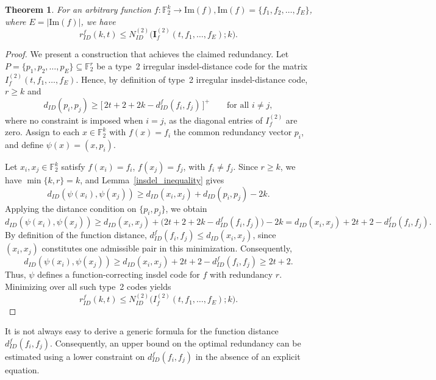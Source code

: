 \documentclass[11 pt]{article}
\numberwithin{equation}{section}
\newtheorem{theorem}{Theorem}[section]
\begin{document}
        \begin{theorem}\label{upper_bound_red}
        For an arbitrary function $f : \mathbb{F}_2^k \to \mathrm{Im}(f), \mathrm{Im}(f) = 
        \{f_1,f_2, \ldots ,f_E \}$, where $E = |\mathrm{Im}(f)|$, we have 
        \[
        r_{ID}^f(k,t) \leq N_{ID}^{(2)}\big(\bm{I}_f^{(2)}(t, f_1, \ldots, f_E);k\big).
        \]
        \end{theorem}
        \begin{proof}
        We present a construction that achieves the claimed redundancy. Let $P = \{p_1, p_2, \ldots, p_E\} \subseteq \mathbb{F}_2^{r}$ be a 
        type~2 irregular insdel-distance code for the matrix $I^{(2)}_f(t, f_1, \ldots, f_E)$. Hence, by definition of type~2 irregular insdel-distance code, $r \geq k$ and
        \[
        d_{ID}(p_i, p_j)
        \geq \big[\, 2t + 2 + 2k - d^{f}_{ID}(f_i, f_j) \,\big]^{+} 
        \qquad \text{for all } i \neq j,
        \]
        where no constraint is imposed when $i = j$, as the diagonal entries of $I^{(2)}_f$ are zero. Assign to each $x \in \mathbb{F}_2^k$ with $f(x) = f_i$ the common redundancy vector $p_i$, and define $\psi(x) = (x, p_i)$.
        
        \noindent
        Let $x_i, x_j \in \mathbb{F}_2^k$ satisfy $f(x_i) = f_i$, $f(x_j) = f_j$, with $f_i \neq f_j$. Since $r \geq k$, we have $\min\{k, r\} = k$, and Lemma~\ref{insdel_inequality} gives
        \[
            d_{ID}(\psi(x_i), \psi(x_j)) 
            \geq d_{ID}(x_i, x_j) + d_{ID}(p_i, p_j) - 2k.
        \]
        Applying the distance condition on $\{p_i, p_j\}$, we obtain
        \[
        d_{ID}(\psi(x_i), \psi(x_j)) 
        \geq d_{ID}(x_i, x_j) + 
       \big(2t + 2 + 2k - d^{f}_{ID}(f_i, f_j)\big) - 2k
        = d_{ID}(x_i, x_j) + 2t + 2 - d^{f}_{ID}(f_i, f_j).
        \]
        By definition of the function distance, $d^{f}_{ID}(f_i, f_j) \leq d_{ID}(x_i, x_j)$, since $(x_i, x_j)$ constitutes one admissible pair in this minimization. Consequently,
         \[
            d_{ID}(\psi(x_i), \psi(x_j)) 
            \geq d_{ID}(x_i, x_j) + 2t + 2 -  d^{f}_{ID}(f_i, f_j) 
            \geq 2t + 2.
        \]
        Thus, $\psi$ defines a function-correcting insdel code for $f$ with redundancy $r$. Minimizing over all such type~2 codes yields
        \[
            r^{f}_{ID}(k, t) 
             \leq N^{(2)}_{ID}\!\big(I^{(2)}_f(t, f_1, \ldots, f_E); 
             k\big). 
        \]
        \end{proof}
        
        
        It is not always easy to derive a generic formula for the function distance $d_{ID}^f(f_i, f_j)$. Consequently, an upper bound on the optimal redundancy can be estimated using a lower constraint on $d_{ID}^f(f_i, f_j)$ in the absence of an explicit equation.
        
\end{document}
